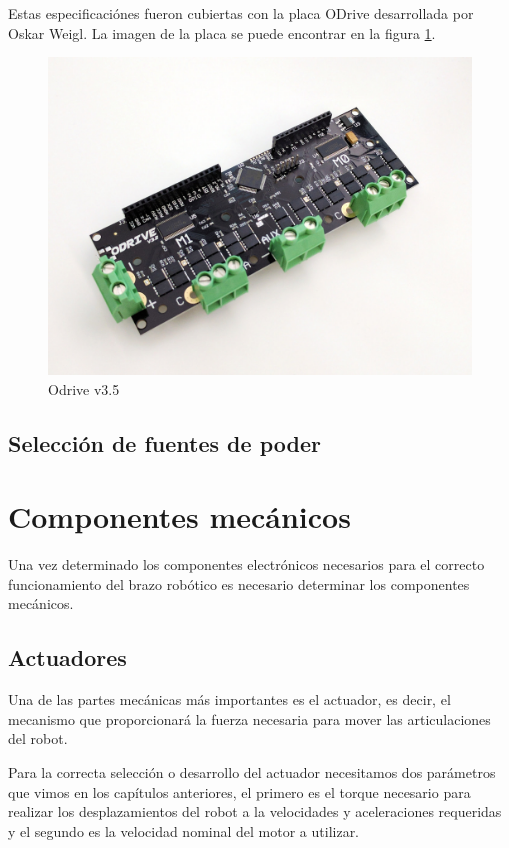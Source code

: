 Estas especificaciónes fueron cubiertas con la placa ODrive desarrollada por Oskar Weigl. La imagen de la placa se puede encontrar en la figura \ref{fig:odrive}.

\begin{figure}
    \centering
    \includegraphics[scale=0.2]{./img/chapter3/odrive.jpeg}
    \caption{Odrive v3.5}
    \label{fig:odrive}
\end{figure}

\subsection{Selección de fuentes de poder}


\section{Componentes mecánicos}

Una vez determinado los componentes electrónicos necesarios para el correcto funcionamiento del brazo robótico es necesario determinar los componentes mecánicos.

\subsection{Actuadores}

Una de las partes mecánicas más importantes es el actuador, es decir, el mecanismo que proporcionará la fuerza necesaria para mover las articulaciones del robot.

Para la correcta selección o desarrollo del actuador necesitamos dos parámetros que vimos en los capítulos anteriores, el primero es el torque necesario para realizar los desplazamientos del robot a la velocidades y aceleraciones requeridas y el segundo es la velocidad nominal del motor a utilizar.

